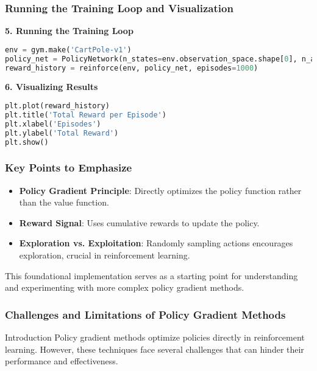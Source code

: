 \documentclass[aspectratio=169]{beamer}
\begin{document}
\begin{frame}[fragile]
    \frametitle{Running the Training Loop and Visualization}
    \textbf{5. Running the Training Loop}
    \begin{lstlisting}[language=python]
env = gym.make('CartPole-v1')
policy_net = PolicyNetwork(n_states=env.observation_space.shape[0], n_actions=env.action_space.n)
reward_history = reinforce(env, policy_net, episodes=1000)
    \end{lstlisting}

    \textbf{6. Visualizing Results}
    \begin{lstlisting}[language=python]
plt.plot(reward_history)
plt.title('Total Reward per Episode')
plt.xlabel('Episodes')
plt.ylabel('Total Reward')
plt.show()
    \end{lstlisting}
\end{frame}

\begin{frame}
    \frametitle{Key Points to Emphasize}
    \begin{itemize}
        \item \textbf{Policy Gradient Principle}: Directly optimizes the policy function rather than the value function.
        \item \textbf{Reward Signal}: Uses cumulative rewards to update the policy.
        \item \textbf{Exploration vs. Exploitation}: Randomly sampling actions encourages exploration, crucial in reinforcement learning.
    \end{itemize}
    This foundational implementation serves as a starting point for understanding and experimenting with more complex policy gradient methods.
\end{frame}

\begin{frame}[fragile]
    \frametitle{Challenges and Limitations of Policy Gradient Methods}
    \begin{block}{Introduction}
        Policy gradient methods optimize policies directly in reinforcement learning. However, these techniques face several challenges that can hinder their performance and effectiveness.
    \end{block}
\end{frame}
\end{document}
